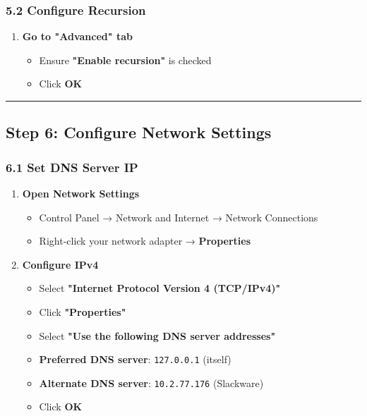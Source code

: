\subsubsection{5.2 Configure Recursion}\label{configure-recursion}

\begin{enumerate}
\def\labelenumi{\arabic{enumi}.}
\tightlist
\item
  \textbf{Go to "Advanced" tab}

  \begin{itemize}
  \tightlist
  \item
    Ensure \textbf{"Enable recursion"} is checked
  \item
    Click \textbf{OK}
  \end{itemize}
\end{enumerate}

\begin{center}\rule{0.5\linewidth}{0.5pt}\end{center}

\subsection{Step 6: Configure Network Settings}\label{step-6-configure-network-settings}

\subsubsection{6.1 Set DNS Server IP}\label{set-dns-server-ip}

\begin{enumerate}
\def\labelenumi{\arabic{enumi}.}
\tightlist
\item
  \textbf{Open Network Settings}

  \begin{itemize}
  \tightlist
  \item
    Control Panel → Network and Internet → Network Connections
  \item
    Right-click your network adapter → \textbf{Properties}
  \end{itemize}
\item
  \textbf{Configure IPv4}

  \begin{itemize}
  \tightlist
  \item
    Select \textbf{"Internet Protocol Version 4 (TCP/IPv4)"}
  \item
    Click \textbf{"Properties"}
  \item
    Select \textbf{"Use the following DNS server addresses"}
  \item
    \textbf{Preferred DNS server}: \texttt{127.0.0.1} (itself)
  \item
    \textbf{Alternate DNS server}: \texttt{10.2.77.176} (Slackware)
  \item
    Click \textbf{OK}
  \end{itemize}
\end{enumerate}

